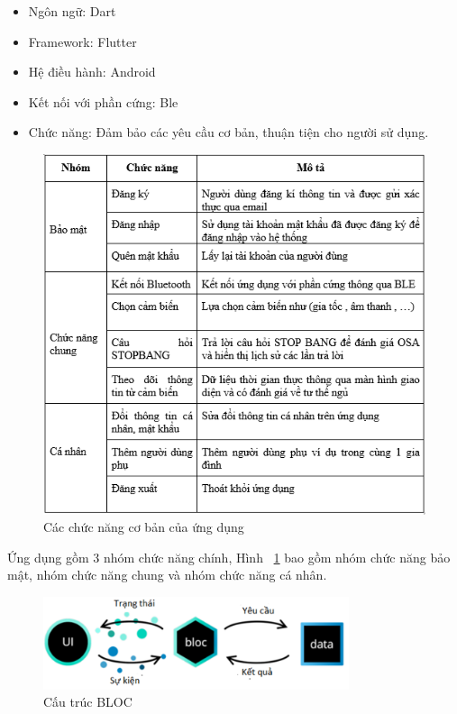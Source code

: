 \begin{itemize}
    \item Ngôn ngữ: Dart
    
    \item Framework: Flutter
    
    \item Hệ điều hành: Android
    
    \item Kết nối với phần cứng: Ble
    
    \item Chức năng: Đảm bảo các yêu cầu cơ bản, thuận tiện cho người sử dụng.
\end{itemize}
\begin{figure}[!]
		\centering
 		\includegraphics[width=1\textwidth]{images/app_flow.png}
		\caption{Các chức năng cơ bản của ứng dụng}
		\label{app_flow}
\end{figure}

Ứng dụng gồm 3 nhóm chức năng chính, Hình ~\ref{app_flow} bao gồm nhóm chức năng bảo mật, nhóm chức năng chung và nhóm chức năng cá nhân.
\begin{figure}[!]
		\centering
 		\includegraphics[width=0.8\textwidth]{images/flutter.png}
		\caption{Cấu trúc BLOC}
		\label{flutter}
\end{figure}


